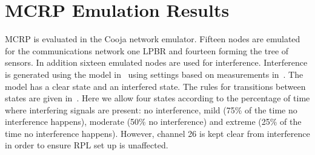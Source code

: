 \section{MCRP Emulation Results}
\label{MCRPemulation}

MCRP is evaluated in the Cooja network emulator.  
Fifteen nodes are emulated for the communications network one LPBR and fourteen forming the tree of sensors.  In addition sixteen emulated nodes are used for interference.  
Interference is generated using the model in~\cite{interferenceModel} using settings based on measurements in~\cite{radio2009}. The model has a clear state and an interfered state.  The rules for transitions between states are given in~\cite{interferenceModel}.  Here we allow four states according to the percentage of time where interfering signals are present: no interference, mild (75\% of the time no interference happens), moderate (50\% no interference) and extreme (25\% of the time no interference happens).  However, channel 26 is kept clear from interference in order to ensure RPL set up is unaffected. 



